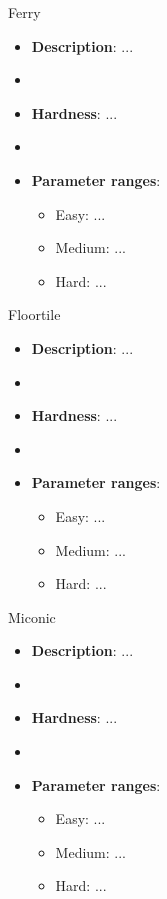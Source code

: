 \documentclass[aspectratio=169,xcolor=dvipsnames]{beamer}
\begin{document}
\begin{frame}{Ferry}

    \begin{itemize}
        \item \textbf{Description}: ...
        \item[]
        \item \textbf{Hardness}: ... 
        \item[]
        \item \textbf{Parameter ranges}: 
        \begin{itemize}
            \item Easy: ...
            \item Medium: ...
            \item Hard: ...
        \end{itemize}
    \end{itemize}
    
\end{frame}


\begin{frame}{Floortile}

    \begin{itemize}
        \item \textbf{Description}: ...
        \item[]
        \item \textbf{Hardness}: ... 
        \item[]
        \item \textbf{Parameter ranges}: 
        \begin{itemize}
            \item Easy: ...
            \item Medium: ...
            \item Hard: ...
        \end{itemize}
    \end{itemize}
    
\end{frame}


\begin{frame}{Miconic}

    \begin{itemize}
        \item \textbf{Description}: ...
        \item[]
        \item \textbf{Hardness}: ... 
        \item[]
        \item \textbf{Parameter ranges}: 
        \begin{itemize}
            \item Easy: ...
            \item Medium: ...
            \item Hard: ...
        \end{itemize}
    \end{itemize}
    
\end{frame}
\end{document}
